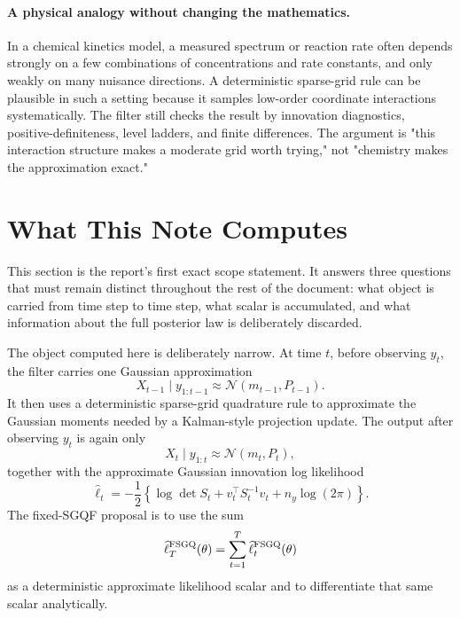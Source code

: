 \documentclass[11pt]{article}
\numberwithin{equation}{section}
\newcommand{\N}{\mathcal N}
\newcommand{\ellhat}{\widehat\ell}
\begin{document}
\paragraph{A physical analogy without changing the mathematics.}
In a chemical kinetics model, a measured spectrum or reaction rate often
depends strongly on a few combinations of concentrations and rate constants,
and only weakly on many nuisance directions.  A deterministic sparse-grid rule
can be plausible in such a setting because it samples low-order coordinate
interactions systematically.  The filter still checks the result by innovation
diagnostics, positive-definiteness, level ladders, and finite differences.  The
argument is "this interaction structure makes a moderate grid worth trying,"
not "chemistry makes the approximation exact."

\section{What This Note Computes}
\label{sec:p31-computes}

This section is the report's first exact scope statement.  It answers three
questions that must remain distinct throughout the rest of the document:
what object is carried from time step to time step, what scalar is accumulated,
and what information about the full posterior law is deliberately discarded.

The object computed here is deliberately narrow.  At time \(t\), before
observing \(y_t\), the filter carries one Gaussian approximation
\begin{equation}
  X_{t-1}\mid y_{1:t-1}
  \approx
  \N(m_{t-1},P_{t-1}).
  \label{eq:p31-carried-gaussian}
\end{equation}
It then uses a deterministic sparse-grid quadrature rule to approximate the
Gaussian moments needed by a Kalman-style projection update.  The output after
observing \(y_t\) is again only
\begin{equation}
  X_t\mid y_{1:t}
  \approx
  \N(m_t,P_t),
  \label{eq:p31-output-gaussian}
\end{equation}
together with the approximate Gaussian innovation log likelihood
\begin{equation}
  \ellhat_t
  =
  -\frac12
  \left\{
  \log\det S_t+v_t^\top S_t^{-1}v_t+n_y\log(2\pi)
  \right\}.
  \label{eq:p31-innovation-loglik-opening}
\end{equation}
The fixed-SGQF proposal is to use the sum
\begin{equation}
  \ellhat_T^{\rm FSGQ}(\theta)=\sum_{t=1}^T \ellhat_t^{\rm FSGQ}(\theta)
  \label{eq:p31-total-fixed-scalar-opening}
\end{equation}
as a deterministic approximate likelihood scalar and to differentiate that
same scalar analytically.
\end{document}
